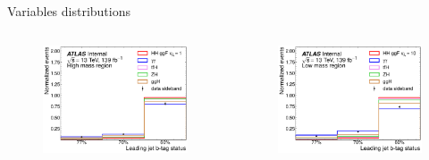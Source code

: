 \begin{frame}{Variables distributions}
\begin{columns}
\begin{figure}
    \centering
    \includegraphics[width=1.\textwidth]{BackUp/Part3/Img/var_SM_jet1_btag.pdf}
\end{figure}
\begin{figure}
    \centering
    \includegraphics[width=1.\textwidth]{BackUp/Part3/Img/var_BSM_jet1_btag.pdf}
\end{figure}
\end{columns}
\end{frame}

